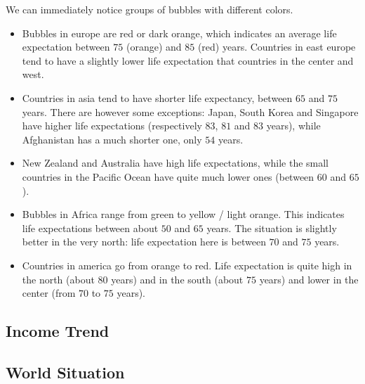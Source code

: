 We can immediately notice groups of bubbles with different colors.
\begin{itemize}
	\item Bubbles in europe are red or dark orange, which indicates an average life expectation between $75$ (orange) and $85$ (red) years.	Countries in east europe tend to have a slightly lower life expectation that countries in the center and west.
	\item Countries in asia tend to have shorter life expectancy, between $65$ and $75$ years. There are however some exceptions: Japan, South Korea and Singapore have higher life expectations (respectively $83$, $81$ and $83$ years), while Afghanistan has a much shorter one, only $54$ years.
	\item New Zealand and Australia have high life expectations, while the small countries in the Pacific Ocean have quite much lower ones (between $60$ and $65$).
	\item Bubbles in Africa range from green to yellow / light orange. This indicates life expectations between about $50$ and $65$ years. The situation is slightly better in the very north: life expectation here is between $70$ and $75$ years.
	\item Countries in america go from orange to red. Life expectation is quite high in the north (about $80$ years) and in the south (about $75$ years) and lower in the center (from $70$ to $75$ years).
\end{itemize}




\subsection{Income Trend}


\subsection{World Situation}

